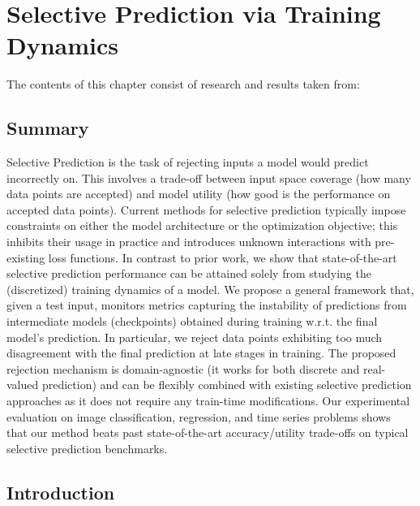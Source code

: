 \newcommand{\shortened}[1]{\color{black} #1\xspace\color{black}}
\newcommand{\newlyadded}[1]{\color{black} #1\xspace\color{black}}
\newcommand{\fixed}[1]{\color{black} #1\xspace\color{black}}


\chapter{Selective Prediction via Training Dynamics}
\label{ch:sptd}

\begin{paperref}
\normalfont
The contents of this chapter consist of research and results taken from: \emph{}
\end{paperref}

\section*{Summary}

Selective Prediction is the task of rejecting inputs a model would predict incorrectly on. This involves a trade-off between input space coverage (how many data points are accepted) and model utility (how good is the performance on accepted data points). Current methods for selective prediction typically impose constraints on either the model architecture or the optimization objective; this inhibits their usage in practice and introduces unknown interactions with pre-existing loss functions. In contrast to prior work, we show that state-of-the-art selective prediction performance can be attained solely from studying the (discretized) training dynamics of a model. We propose a general framework that, given a test input, monitors metrics capturing the instability of predictions from intermediate models (\ie checkpoints) obtained during training w.r.t. the final model's prediction. In particular, we reject data points exhibiting too much disagreement with the final prediction at late stages in training. The proposed rejection mechanism is domain-agnostic (\ie it works for both discrete and real-valued prediction) and can be flexibly combined with existing selective prediction approaches as it does not require any train-time modifications. Our experimental evaluation on image classification, regression, and time series problems shows that our method beats past state-of-the-art accuracy/utility trade-offs on typical selective prediction benchmarks.


\section{Introduction}

